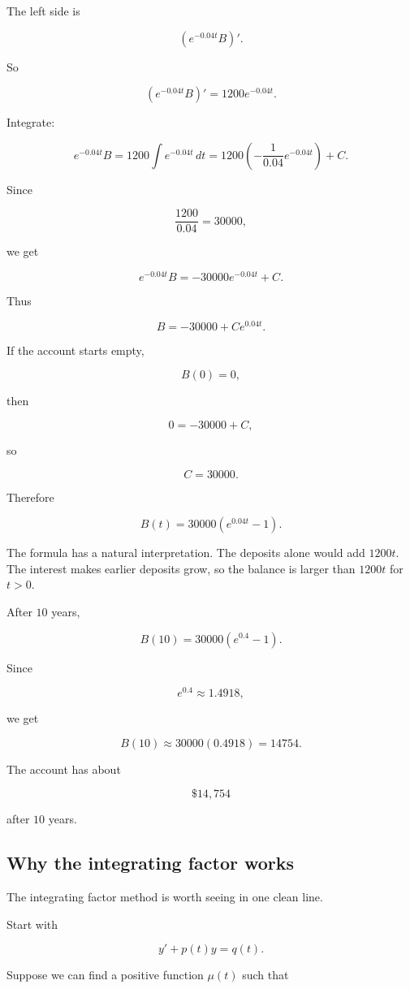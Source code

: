 The left side is

\[
(e^{-0.04t}B)'.
\]

So

\[
(e^{-0.04t}B)'=1200e^{-0.04t}.
\]

Integrate:

\[
e^{-0.04t}B
=
1200\int e^{-0.04t}\,dt
=
1200\left(-\frac1{0.04}e^{-0.04t}\right)+C.
\]

Since

\[
\frac{1200}{0.04}=30000,
\]

we get

\[
e^{-0.04t}B=-30000e^{-0.04t}+C.
\]

Thus

\[
B=-30000+Ce^{0.04t}.
\]

If the account starts empty,

\[
B(0)=0,
\]

then

\[
0=-30000+C,
\]

so

\[
C=30000.
\]

Therefore

\[
\boxed{
B(t)=30000\left(e^{0.04t}-1\right).
}
\]

The formula has a natural interpretation.  The deposits alone would add \(1200t\).  The
interest makes earlier deposits grow, so the balance is larger than \(1200t\) for \(t>0\).

After \(10\) years,

\[
B(10)=30000\left(e^{0.4}-1\right).
\]

Since

\[
e^{0.4}\approx1.4918,
\]

we get

\[
B(10)\approx30000(0.4918)=14754.
\]

The account has about

\[
\boxed{\$14{,}754}
\]

after \(10\) years.

\subsection{Why the integrating factor works}
\label{subsec:why-integrating-factor-works}

The integrating factor method is worth seeing in one clean line.

Start with

\[
y'+p(t)y=q(t).
\]

Suppose we can find a positive function \(\mu(t)\) such that

